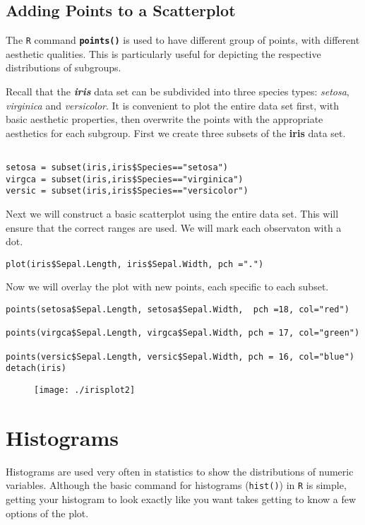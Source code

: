\subsection{Adding Points to a Scatterplot}
The \texttt{R} command \textbf{\texttt{points()}} is used to have different group of points, with different aesthetic qualities. This is particularly useful for depicting the respective distributions of subgroups.


Recall that the \textbf{\textit{iris}} data set can be subdivided into three species types: \textit{setosa}, \textit{virginica} and \textit{versicolor}.
It is convenient to plot the entire data set first, with basic aesthetic properties, then overwrite the points with the appropriate aesthetics for each subgroup. First we create three subsets of the \textbf{iris} data set.
\begin{framed}
\begin{verbatim}

setosa = subset(iris,iris$Species=="setosa")
virgca = subset(iris,iris$Species=="virginica")
versic = subset(iris,iris$Species=="versicolor")
\end{verbatim}
\end{framed}
Next we will construct a basic scatterplot using the entire data set. This will ensure that the correct ranges are used. We will mark each observaton with a dot.
\begin{framed}
\begin{verbatim}
plot(iris$Sepal.Length, iris$Sepal.Width, pch =".")
\end{verbatim}
\end{framed}
Now we will overlay the plot with new points, each specific to each subset.
\begin{framed}
\begin{verbatim}
points(setosa$Sepal.Length, setosa$Sepal.Width,  pch =18, col="red")

points(virgca$Sepal.Length, virgca$Sepal.Width, pch = 17, col="green")

points(versic$Sepal.Length, versic$Sepal.Width, pch = 16, col="blue")
detach(iris)
\end{verbatim}
\end{framed}
\begin{figure}[h!]
\centering
\texttt{[image: ./irisplot2]}
\end{figure}

\newpage
\section{Histograms}
Histograms are used very often in statistics to show the distributions of numeric variables.  Although the basic command for histograms (\texttt{hist()}) in \texttt{R} is simple, getting your histogram to look exactly like you want takes getting to know a few options of the plot. 


